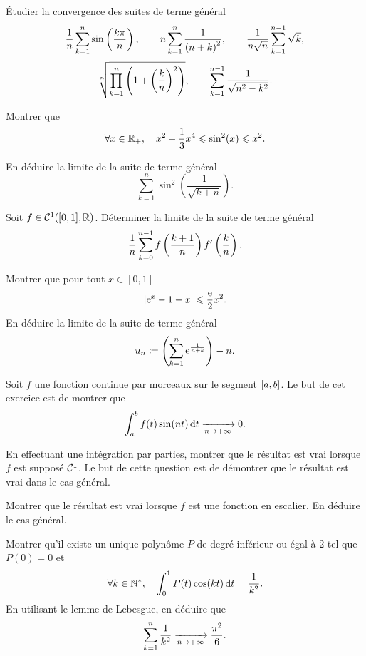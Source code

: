 \documentclass{magnolia}
\begin{document}
Étudier la convergence des suites de terme général
\[\frac{1}{n}\sum_{k=1}^n \sin\left(\frac{k\pi}{n}\right), \qquad
  n\sum_{k=1}^n \frac{1}{\left(n+k\right)^2}, \qquad
  \frac{1}{n\sqrt{n}}\sum_{k=1}^{n-1} \sqrt{k},\]
\[\sqrt[n]{\prod_{k=1}^n \left(1+\left(\frac{k}{n}\right)^2\right)}, \qquad
  \sum_{k=1}^{n-1} \frac{1}{\sqrt{n^2-k^2}}.\]

\begin{questions}
\question Montrer que
  \[\forall x \in\mathbb{R}_+ ,\quad x^2-\frac 13 x^4 \leqslant \sin^2( x)\leqslant x^2.\]
\item En déduire la limite de la suite de terme général
  \[\sum\limits_{k=1}^n \sin^2 \left(\frac 1{\sqrt{k+n}} \right).\]
\end{questions}

Soit $f \in\mathcal{C}^{1}([0,1],\mathbb{R})$. Déterminer la limite de la suite de terme général
\[\frac 1n \sum\limits_{k=0}^{n-1} f\left(\frac{k+1}n\right) f'\left(\frac kn\right).\]

\begin{questions}
\question Montrer que pour tout $x\in[0,1]$
  \[\left|{\rm e}^x-1-x\right|\leqslant\frac{{\rm e}}{2}x^2.\]
\question En déduire la limite de la suite de terme général
  \[u_n\coloneqq \left(\sum_{k=1}^n {\rm e}^{\frac{1}{n+k}}\right) -n.\]
\end{questions}


Soit $f$ une fonction continue par morceaux sur le segment $\left[a,b\right]$.
Le but de cet exercice est de montrer que
\[\int_{a}^{b} f(t)\sin(nt)\,\text{d}t \xrightarrow[n\rightarrow +\infty]{} 0.\]
\begin{questions}
\question En effectuant une intégration par parties, montrer que le résultat
  est vrai lorsque $f$ est supposé $\mathcal{C}^{1}$.
\question Le but de cette question est de démontrer que le résultat est vrai
  dans le cas général.
  \begin{questions}
  \question Montrer que le résultat est vrai lorsque $f$ est une fonction en
    escalier.
  \question En déduire le cas général.
  \end{questions}
\end{questions}


\begin{questions}
\question Montrer qu'il existe un unique polynôme $P$ de degré
  inférieur ou égal à 2 tel que $P(0)=0$ et
  \[\forall k\in{\mathbb{N}^*} ,\quad \int_{0}^{1} P(t)\cos(kt)\,\text{d}t=\frac{1}{k^2}.\]
\question En utilisant le lemme de Lebesgue, en déduire que
  \[\sum_{k=1}^n \frac{1}{k^2}\xrightarrow[n\rightarrow +\infty]{}\frac{\pi^2}{6}.\]
\end{questions}
\end{document}

